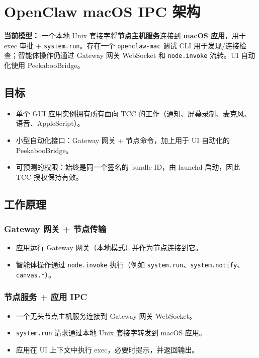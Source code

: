 \clearpage

\section{OpenClaw macOS IPC 架构}


\textbf{当前模型：} 一个本地 Unix 套接字将\textbf{节点主机服务}连接到 \textbf{macOS 应用}，用于 exec 审批 + \texttt{system.run}。存在一个 \texttt{openclaw-mac} 调试 CLI 用于发现/连接检查；智能体操作仍通过 Gateway 网关 WebSocket 和 \texttt{node.invoke} 流转。UI 自动化使用 PeekabooBridge。

\subsection{目标}


\begin{itemize}
  \item 单个 GUI 应用实例拥有所有面向 TCC 的工作（通知、屏幕录制、麦克风、语音、AppleScript）。
  \item 小型自动化接口：Gateway 网关 + 节点命令，加上用于 UI 自动化的 PeekabooBridge。
  \item 可预测的权限：始终是同一个签名的 bundle ID，由 launchd 启动，因此 TCC 授权保持有效。
\end{itemize}


\subsection{工作原理}


\subsubsection{Gateway 网关 + 节点传输}


\begin{itemize}
  \item 应用运行 Gateway 网关（本地模式）并作为节点连接到它。
  \item 智能体操作通过 \texttt{node.invoke} 执行（例如 \texttt{system.run}、\texttt{system.notify}、\texttt{canvas.*}）。
\end{itemize}


\subsubsection{节点服务 + 应用 IPC}


\begin{itemize}
  \item 一个无头节点主机服务连接到 Gateway 网关 WebSocket。
  \item \texttt{system.run} 请求通过本地 Unix 套接字转发到 macOS 应用。
  \item 应用在 UI 上下文中执行 exec，必要时提示，并返回输出。
\end{itemize}


